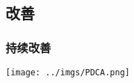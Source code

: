 \documentclass[UTF8,8pt,xcolor=dvipsnames]{beamer}
\begin{document}
\subsection{改善}

\begin{frame}[fragile]
    \frametitle{持续改善}
    \begin{center}
        \texttt{[image: ../imgs/PDCA.png]}
    \end{center}
\end{frame}


\end{document}

